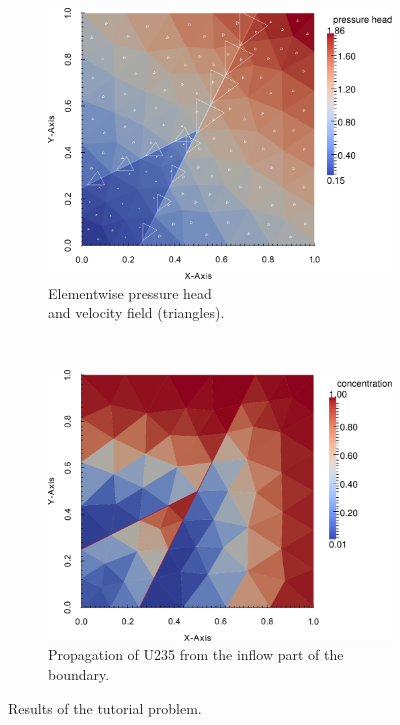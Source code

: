 \documentclass[12pt,a4paper]{report}
\begin{document}
\begin{figure}
    \centering
    \begin{subfigure}[b]{0.45\textwidth}
        \centering
        \includegraphics[scale=0.4]{./03_flow.pdf}
        \caption{Elementwise pressure head\\and velocity field (triangles).}
        \label{fig:tut-flow}
    \end{subfigure}
    ~
    \begin{subfigure}[b]{0.45\textwidth}
        \centering
        \includegraphics[scale=0.4]{./03_trans.pdf}
        \caption{Propagation of U235 from the inflow part of the boundary.}
        \label{fig:tut-trans}
    \end{subfigure}
    \caption{Results of the tutorial problem.}
    \label{fig:tutorial}
\end{figure}
\end{document}

